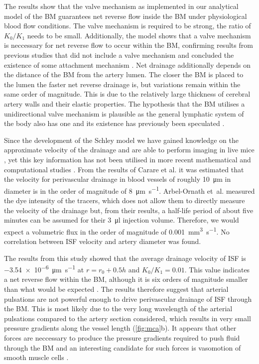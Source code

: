 \documentclass[a4paper,titlepage]{scrartcl}
\begin{document}
The results show that the valve mechanism as implemented in our analytical model of the BM guarantees net reverse flow inside the BM under physiological blood flow conditions. The valve mechanism is required to be strong, \ie the ratio of $K_0/K_1$ needs to be small. Additionally, the model shows that a valve mechanism is neccessary for net reverse flow to occur within the BM, confirming results from previous studies that did not include a valve mechanism and concluded the existence of some attachment mechanism \cite{Schley2006,Wang2011}. Net drainage additionally depends on the distance of the BM from the artery lumen. The closer the BM is placed to the lumen the faster net reverse drainage is, but variations remain within the same order of magnitude. This is due to the relatively large thickness of cerebral artery walls and their elastic properties. The hypothesis that the BM utilises a unidirectional valve mechanism is plausible as the general lymphatic system of the body also has one and its existence has previously been speculated \cite{Weller2010,Schley2006,Heppell2013}.

Since the development of the Schley model we have gained knowledge on the approximate velocity of the drainage and are able to perform imaging in live mice \cite{Carare2008,Schley2006,Arbel-Ornath2013}, yet this key information has not been utilised in more recent mathematical and computational studies \cite{Wang2011,Sharp2015}. From the results of Carare et al. \cite{Carare2008} it was estimated that the velocity for perivascular drainage in blood vessels of roughly \SI{10}{\micro\metre} in diameter is in the order of magnitude of \SI{8}{\micro\metre\per\second}. Arbel-Ornath et~al. \cite{Arbel-Ornath2013} measured the dye intensity of the tracers, which does not allow them to directly measure the velocity of the drainage but, from their results, a half-life period of about five minutes can be assumed for their \SI{3}{\micro\litre} injection volume. Therefore, we would expect a volumetric flux in the order of magnitude of \SI{0.001}{\cubic\milli\metre\per\second}. No correlation between ISF velocity and artery diameter was found.

The results from this study showed that the average drainage velocity of ISF is \SI{-3.54e-6}{\micro\metre\per\second} at $r = r_0 + 0.5h$ and $K_0/K_1 = 0.01$. This value indicates a net reverse flow within the BM, although it is six orders of magnitude smaller than what would be expected \cite{Carare2008}. The results therefore suggest that arterial pulsations are not powerful enough to drive perivascular drainage of ISF through the BM. This is most likely due to the very long wavelength of the arterial pulsations compared to the artery section considered, which results in very small pressure gradients along the vessel length (\autoref{fig:mca}b). It appears that other forces are neccessary to produce the pressure gradients required to push fluid through the BM and an interesting candidate for such forces is vasomotion of smooth muscle cells \cite{DiMarco2015}.
\end{document}
